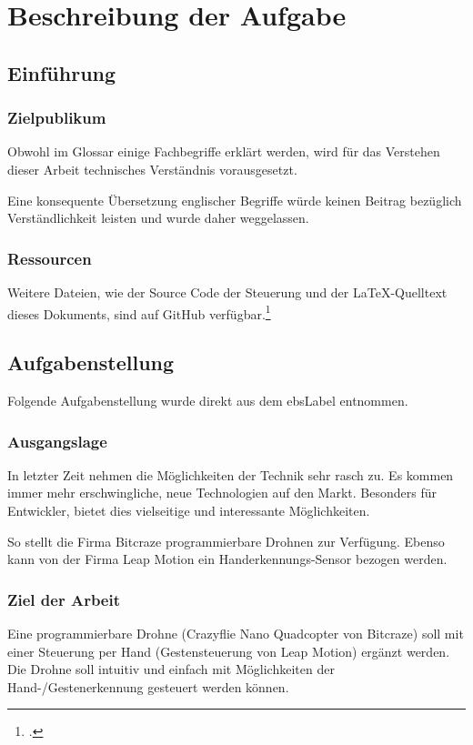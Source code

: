 \chapter{Beschreibung der Aufgabe}

\section{Einführung}

\subsection{Zielpublikum}
Obwohl im Glossar einige Fachbegriffe erklärt werden, wird für das Verstehen dieser Arbeit technisches Verständnis vorausgesetzt.

Eine konsequente Übersetzung englischer Begriffe würde keinen Beitrag bezüglich Verständlichkeit leisten und wurde daher weggelassen.

\subsection{Ressourcen}
Weitere Dateien, wie der Source Code der Steuerung und der \LaTeX-Quelltext dieses Dokuments, sind auf GitHub verfügbar.\footcite{github_droneGestures_2015-05-01}


\section{Aufgabenstellung}
Folgende Aufgabenstellung wurde direkt aus dem \gls{ebsLabel} entnommen.

\subsection{Ausgangslage}
In letzter Zeit nehmen die Möglichkeiten der Technik sehr rasch zu. Es kommen immer mehr erschwingliche, neue Technologien auf den Markt. Besonders für Entwickler, bietet dies vielseitige und interessante Möglichkeiten.

So stellt die Firma Bitcraze programmierbare Drohnen zur Verfügung. Ebenso kann von der Firma Leap Motion ein Handerkennungs-Sensor bezogen werden.

\subsection{Ziel der Arbeit}
Eine programmierbare Drohne (Crazyflie Nano Quadcopter von Bitcraze) soll mit einer Steuerung per Hand (Gestensteuerung von Leap Motion) ergänzt werden.
Die Drohne soll intuitiv und einfach mit Möglichkeiten der Hand-/Gestenerkennung gesteuert werden können.

